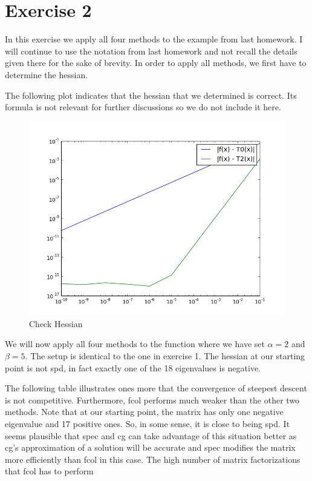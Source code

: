 \documentclass{article}
\begin{document}
\section{Exercise 2}
In this exercise we apply all four methods to the example from last homework. I will continue to use the notation from last
homework and not recall the details given there for the sake of brevity. In order to apply all methods, we first have to determine
the hessian. \par
The following plot indicates that the hessian that we determined is correct. Its formula is not relevant for further discussions so we do not
include it here.
\begin{figure}[H]
  \centering
  \includegraphics[scale=0.5]{hessian2.png}
  \caption{Check Hessian}
\end{figure}
We will now apply all four methods to the function where we have set $\alpha=2$ and $\beta=5$. The setup is identical to the one
in exercise 1. The hessian at our starting point is not spd, in fact exactly one of the 18 eigenvalues is negative.\par
The following table illustrates ones more that the convergence of steepest descent is not competitive. Furthermore,
fcol performs much weaker than the other two methods. Note that at our starting point, the matrix has only one negative eigenvalue and
17 positive ones. So, in some sense, it is close to being spd. It seems plausible that spec and cg can take advantage of this situation better as cg's approximation
of a solution will be accurate and spec modifies the matrix more efficiently than fcol in this case. The high number of matrix factorizations that fcol has to perform
\end{document}
